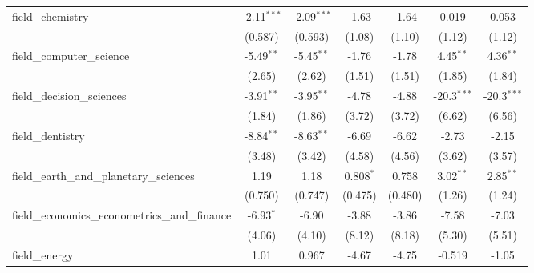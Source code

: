 \begin{tabular}{lcccccc}
   field\_chemistry                                            & -2.11$^{***}$  & -2.09$^{***}$  & -1.63         & -1.64         & 0.019          & 0.053\\   
                                                               & (0.587)        & (0.593)        & (1.08)        & (1.10)        & (1.12)         & (1.12)\\   
   field\_computer\_science                                    & -5.49$^{**}$   & -5.45$^{**}$   & -1.76         & -1.78         & 4.45$^{**}$    & 4.36$^{**}$\\   
                                                               & (2.65)         & (2.62)         & (1.51)        & (1.51)        & (1.85)         & (1.84)\\   
   field\_decision\_sciences                                   & -3.91$^{**}$   & -3.95$^{**}$   & -4.78         & -4.88         & -20.3$^{***}$  & -20.3$^{***}$\\   
                                                               & (1.84)         & (1.86)         & (3.72)        & (3.72)        & (6.62)         & (6.56)\\   
   field\_dentistry                                            & -8.84$^{**}$   & -8.63$^{**}$   & -6.69         & -6.62         & -2.73          & -2.15\\   
                                                               & (3.48)         & (3.42)         & (4.58)        & (4.56)        & (3.62)         & (3.57)\\   
   field\_earth\_and\_planetary\_sciences                      & 1.19           & 1.18           & 0.808$^{*}$   & 0.758         & 3.02$^{**}$    & 2.85$^{**}$\\   
                                                               & (0.750)        & (0.747)        & (0.475)       & (0.480)       & (1.26)         & (1.24)\\   
   field\_economics\_econometrics\_and\_finance                & -6.93$^{*}$    & -6.90          & -3.88         & -3.86         & -7.58          & -7.03\\   
                                                               & (4.06)         & (4.10)         & (8.12)        & (8.18)        & (5.30)         & (5.51)\\   
   field\_energy                                               & 1.01           & 0.967          & -4.67         & -4.75         & -0.519         & -1.05\\   

\end{tabular}
